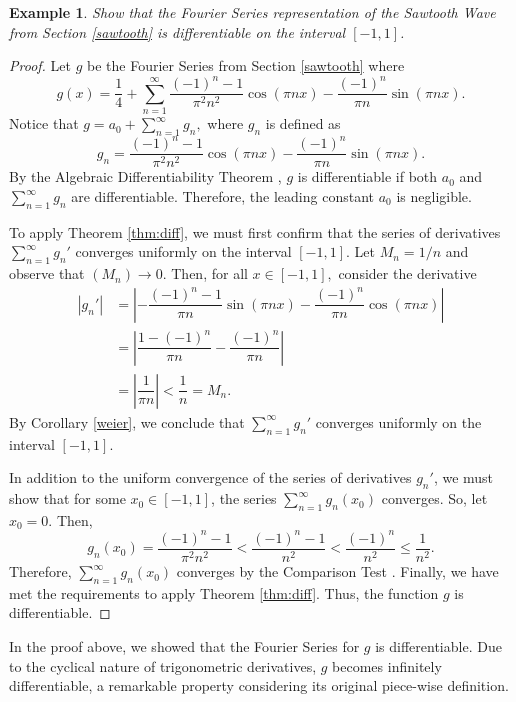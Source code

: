 \documentclass[11pt]{amsart}
\theoremstyle{plain}
\newtheorem{eg}[theorem]{Example}
\theoremstyle{definition}
\begin{document}
\begin{eg}
    Show that the Fourier Series representation of the Sawtooth Wave from Section \ref{sawtooth} is differentiable on the interval $[-1,1]$.
\end{eg}
\begin{proof}
    Let $g$ be the Fourier Series from Section \ref{sawtooth} where $$g(x) = \dfrac{1}{4} + \sum_{n=1}^\infty \dfrac{(-1)^n-1}{\pi^2 n^2}\cos(\pi nx) - \dfrac{(-1)^n}{\pi n}\sin(\pi nx).$$ Notice that $g = a_0 + \sum_{n=1}^\infty g_n,$ where $g_n$ is defined as $$g_n = \dfrac{(-1)^n-1}{\pi^2 n^2}\cos(\pi nx) - \dfrac{(-1)^n}{\pi n}\sin(\pi nx).$$ By the Algebraic Differentiability Theorem \cite{Abbott}, $g$ is differentiable if both $a_0$ and $\sum_{n=1}^\infty g_n$ are differentiable. Therefore, the leading constant $a_0$ is negligible.

    To apply Theorem \ref{thm:diff}, we must first confirm that the series of derivatives $\sum_{n=1}^\infty g_n'$ converges uniformly on the interval $[-1,1]$. Let $M_n = 1/n$ and observe that $(M_n)\to 0$. Then, for all $x\in[-1,1],$ consider the derivative
    \begin{align*}
        \left|g_n'\right| &= \left|-\dfrac{(-1)^n-1}{\pi n}\sin(\pi nx)-\dfrac{(-1)^n}{\pi n}\cos(\pi nx)\right|\\
            &= \left|\dfrac{1-(-1)^n}{\pi n}-\dfrac{(-1)^n}{\pi n}\right|\\
            &= \left|\dfrac{1}{\pi n}\right| < \dfrac{1}{n} =M_n.
    \end{align*}
    By Corollary \ref{weier}, we conclude that $\sum_{n=1}^\infty g_n'$ converges uniformly on the interval $[-1,1]$.

    In addition to the uniform convergence of the series of derivatives $g_n'$, we must show that for some $x_0\in[-1,1]$, the series $\sum_{n=1}^\infty g_n(x_0)$ converges. So, let $x_0 = 0$. Then, $$g_n(x_0) = \dfrac{(-1)^n-1}{\pi^2n^2} < \dfrac{(-1)^n-1}{n^2}<\dfrac{(-1)^n}{n^2}\leq\dfrac{1}{n^2}.$$ Therefore, $\sum_{n=1}^\infty g_n(x_0)$ converges by the Comparison Test \cite{Abbott}. Finally, we have met the requirements to apply Theorem \ref{thm:diff}. Thus, the function $g$ is differentiable. 
    \end{proof}

In the proof above, we showed that the Fourier Series for $g$ is differentiable. Due to the cyclical nature of trigonometric derivatives, $g$ becomes infinitely differentiable, a remarkable property considering its original piece-wise definition.
\end{document}

